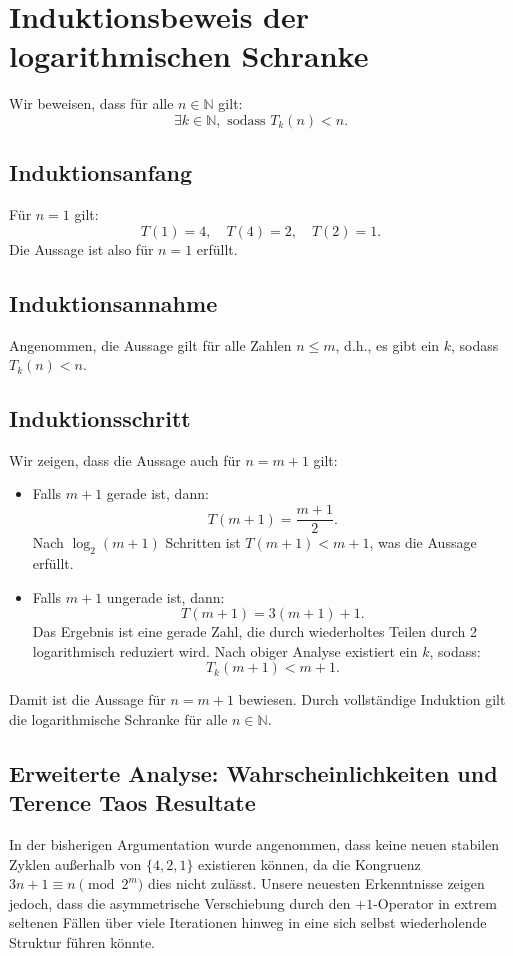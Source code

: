 \documentclass[a4paper,12pt]{article}
\begin{document}
\section{Induktionsbeweis der logarithmischen Schranke}
Wir beweisen, dass für alle \( n \in \mathbb{N} \) gilt:
\[
\exists k \in \mathbb{N}, \text{ sodass } T_k(n) < n.
\]

\subsection{Induktionsanfang}
Für \( n = 1 \) gilt:
\[
T(1) = 4, \quad T(4) = 2, \quad T(2) = 1.
\]
Die Aussage ist also für \( n = 1 \) erfüllt.

\subsection{Induktionsannahme}
Angenommen, die Aussage gilt für alle Zahlen \( n \leq m \), d.h., es gibt ein \( k \), sodass \( T_k(n) < n \).

\subsection{Induktionsschritt}
Wir zeigen, dass die Aussage auch für \( n = m + 1 \) gilt:
\begin{itemize}
    \item Falls \( m + 1 \) gerade ist, dann:
    \[
    T(m + 1) = \frac{m + 1}{2}.
    \]
    Nach \( \log_2(m + 1) \) Schritten ist \( T(m + 1) < m + 1 \), was die Aussage erfüllt.
    \item Falls \( m + 1 \) ungerade ist, dann:
    \[
    T(m + 1) = 3(m + 1) + 1.
    \]
    Das Ergebnis ist eine gerade Zahl, die durch wiederholtes Teilen durch 2 logarithmisch reduziert wird. Nach obiger Analyse existiert ein \( k \), sodass:
    \[
    T_k(m + 1) < m + 1.
    \]
\end{itemize}

Damit ist die Aussage für \( n = m + 1 \) bewiesen. Durch vollständige Induktion gilt die logarithmische Schranke für alle \( n \in \mathbb{N} \).

\subsection{Erweiterte Analyse: Wahrscheinlichkeiten und Terence Taos Resultate}

In der bisherigen Argumentation wurde angenommen, dass keine neuen stabilen Zyklen außerhalb von \( \{4,2,1\} \) existieren können, da die Kongruenz \( 3n + 1 \equiv n \pmod{2^m} \) dies nicht zulässt. Unsere neuesten Erkenntnisse zeigen jedoch, dass die asymmetrische Verschiebung durch den \(+1\)-Operator in extrem seltenen Fällen über viele Iterationen hinweg in eine sich selbst wiederholende Struktur führen könnte.
\end{document}
